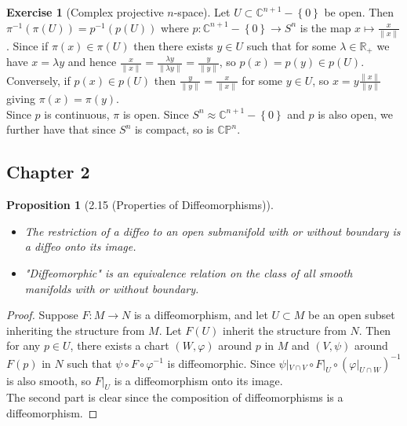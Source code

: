 \documentclass[reqno]{amsart}
\theoremstyle{plain}%
\newtheorem{proposition}[theorem]{Proposition}
\theoremstyle{definition}
\newtheorem{exercise}[theorem]{Exercise}
\theoremstyle{remark}
\begin{document}
    \begin{exercise}[Complex projective $n$-space]
        Let $U \subset \mathbb{C}^{n+1} - \left\{ 0 \right\} $ 
        be open. Then
        $\pi^{-1} \left( \pi (U) \right) 
        = p^{-1} \left( p (U) \right) $ where
        $p  \colon \mathbb{C}^{n+1} - \left\{ 0 \right\} 
        \to S^{n}$ is the map
        $x \mapsto \frac{x}{\|x\|}$.
        Since if $\pi (x) \in \pi (U)$ then
        there exists $y \in U$ such that for some
        $\lambda \in \mathbb{R}_+$  we have
        $x = \lambda y$ and hence
        $\frac{x}{\|x\|} = \frac{\lambda y}{\|\lambda y\|}
        = \frac{y}{\|y\|}$, so 
        $p(x) = p(y) \in p\left( U \right) $. Conversely,
        if $p(x) \in p(U)$ then 
        $\frac{y}{\|y\|} = \frac{x}{\|x\|}$ for some $y \in U$, so
        $x = y \frac{\|x\|}{\|y\|}$ giving
        $\pi(x) = \pi(y)$.\\
        Since $p$ is continuous, $\pi$ is open. Since 
        $S^{n} \approx \mathbb{C}^{n+1} - \left\{ 0 \right\} $ and
        $p$ is also open, we further have that since
        $S^{n}$ is compact, so is $\mathbb{C}\mathbb{P}^{n}$.
    \end{exercise}

    \subsection{Chapter 2}

    \begin{proposition}[2.15 (Properties of Diffeomorphisms)]
        \begin{itemize}
            \item The restriction of a diffeo to an open 
                submanifold with or without boundary is a 
                diffeo onto its image.
            \item "Diffeomorphic" is an equivalence relation
                on the class of all smooth manifolds with
                or without boundary.
        \end{itemize}
    \end{proposition}

    \begin{proof}
        Suppose $F  \colon M \to N$ is a diffeomorphism, and
        let $U \subset M$ be an open subset inheriting
        the structure from $M$. Let
        $F(U)$ inherit the structure from $N$.
        Then for any $p \in U$, there exists a
        chart $\left( W, \varphi \right) $ around $p$ 
        in $M$ and $\left( V, \psi \right) $ around $F(p)$ in
        $N$ such that $\psi \circ F \circ \varphi^{-1}$ is
        diffeomorphic. Since $\psi|_{V \cap V} \circ F|_{U} \circ
        \left( \varphi|_{U \cap W} \right)^{-1} $ is also
        smooth, so  $F|_{U}$ is a diffeomorphism onto its
        image.\\
        \linebreak
        The second part is clear since the composition
        of diffeomorphisms is a diffeomorphism.
    \end{proof}
\end{document}

